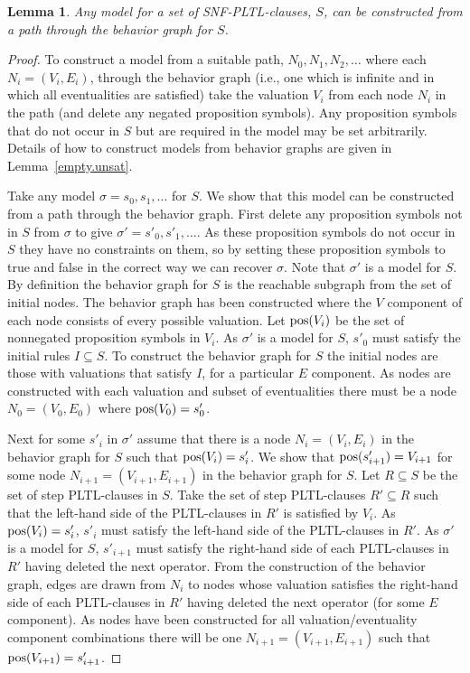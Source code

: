 \documentclass[nohyperref]{acmtrans2f}
\newtheorem{sublemma}{Lemma}[subsection]
\begin{document}
\vspace{1ex}
\begin{sublemma}
\label{any.model}
Any model for a set of SNF-PLTL-clauses, $S$, can be constructed from a path
through the behavior graph for $S$.
\end{sublemma}
\begin{proof}
To construct a model from a suitable path, $N_0,N_1,N_2,\ldots$ where each
$N_i = (V_i,E_i)$, through 
the behavior graph (i.e., one which is infinite and in which all
eventualities are satisfied) take the valuation $V_i$ from
each node $N_i$ in the path (and delete any negated proposition symbols). Any
proposition symbols that do not occur in $S$ but 
are required in the model may be set arbitrarily. Details of how to
construct models from behavior graphs are given in
Lemma~\ref{empty.unsat}.

Take any model $\sigma = s_0, s_1, \ldots$ for $S$. We show that
this model can be constructed from a path through the behavior
graph. First delete any 
proposition symbols not in $S$ from $\sigma$ to give $\sigma' = s'_0, s'_1,
\ldots$. As these proposition symbols do not occur in $S$ they have no constraints
on them, so by setting these proposition symbols to true and false in the correct
way we can 
recover $\sigma$. Note that $\sigma'$ is a model for $S$. By definition the
behavior graph for $S$ is the reachable subgraph from the set of 
initial nodes. The behavior graph has been constructed where the $V$
component of each node consists of every possible valuation. Let ${\rm
pos}(V_i)$ be the set of nonnegated proposition symbols in $V_i$. As $\sigma'$
is a model for $S$, $s'_0$ must satisfy the initial rules $I \subseteq S$. To
construct the behavior graph for $S$ the initial nodes are those with
valuations that satisfy $I$, for a particular $E$ component. As nodes are
constructed with each valuation and subset of eventualities there must be a
node $N_0 =(V_0,E_0)$ where ${\rm pos}(V_0) = s'_0$.

Next for some $s'_i$ in $\sigma'$ assume that there is a node $N_i
=(V_i,E_i)$ in the behavior graph for $S$ such that ${\rm pos}(V_i) = s'_i$.
We show that ${\rm pos}(s'_{i+1}) = V_{i+1}$ for some node $N_{i+1}
=(V_{i+1},E_{i+1})$ in the behavior graph for $S$. Let $R \subseteq S$ be
the set of step PLTL-clauses in $S$. Take the set of step
PLTL-clauses $R' 
\subseteq R$ such that the left-hand side of the PLTL-clauses in $R'$ is
satisfied by $V_i$. As  ${\rm pos}(V_i) = s'_i$, $s'_i$ must satisfy the left-hand
side of the PLTL-clauses in $R'$. As $\sigma'$ is a model for $S$,
$s'_{i+1}$ must satisfy the right-hand side of each PLTL-clauses in $R'$
having deleted the next operator. From the construction of the behavior
graph, edges are drawn from $N_i$ to nodes whose valuation satisfies 
the right-hand side of each PLTL-clauses in $R'$ having deleted the next
operator (for some $E$ component). As nodes have been constructed for all
valuation/eventuality component combinations there will be one
$N_{i+1}=(V_{i+1},E_{i+1})$ such that ${\rm pos}(V_{i+1})=s'_{i+1}$.


\end{proof}
\end{document}
